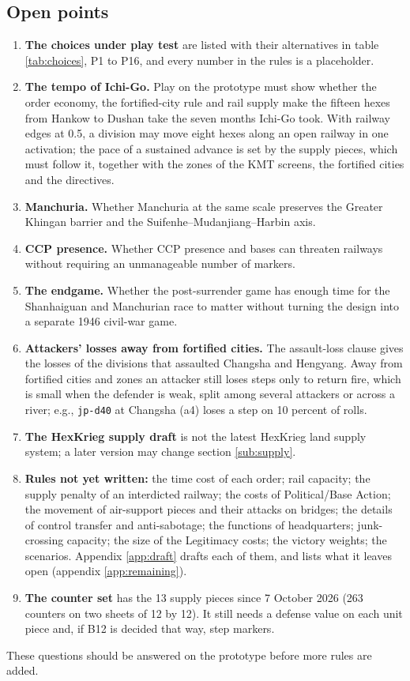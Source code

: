 \documentclass[11pt]{article}
\begin{document}
\subsection{Open points}\label{sub:open}
\begin{enumerate}
\item \textbf{The choices under play test} are listed with their alternatives in table \ref{tab:choices}, P1 to P16, and every number in the rules is a placeholder.
\item \textbf{The tempo of Ichi-Go.} Play on the prototype must show whether the order economy, the fortified-city rule and rail supply make the fifteen hexes from Hankow to Dushan take the seven months Ichi-Go took. With railway edges at 0.5, a division may move eight hexes along an open railway in one activation; the pace of a sustained advance is set by the supply pieces, which must follow it, together with the zones of the KMT screens, the fortified cities and the directives.
\item \textbf{Manchuria.} Whether Manchuria at the same scale preserves the Greater Khingan barrier and the Suifenhe--Mudanjiang--Harbin axis.
\item \textbf{CCP presence.} Whether CCP presence and bases can threaten railways without requiring an unmanageable number of markers.
\item \textbf{The endgame.} Whether the post-surrender game has enough time for the Shanhaiguan and Manchurian race to matter without turning the design into a separate 1946 civil-war game.
\item \textbf{Attackers' losses away from fortified cities.} The assault-loss clause gives the losses of the divisions that assaulted Changsha and Hengyang. Away from fortified cities and zones an attacker still loses steps only to return fire, which is small when the defender is weak, split among several attackers or across a river; e.g., \texttt{jp-d40} at Changsha (a4) loses a step on 10 percent of rolls.
\item \textbf{The HexKrieg supply draft} is not the latest HexKrieg land supply system; a later version may change section \ref{sub:supply}.
\item \textbf{Rules not yet written:} the time cost of each order; rail capacity; the supply penalty of an interdicted railway; the costs of Political/Base Action; the movement of air-support pieces and their attacks on bridges; the details of control transfer and anti-sabotage; the functions of headquarters; junk-crossing capacity; the size of the Legitimacy costs; the victory weights; the scenarios. Appendix \ref{app:draft} drafts each of them, and lists what it leaves open (appendix \ref{app:remaining}).
\item \textbf{The counter set} has the 13 supply pieces since 7 October 2026 (263 counters on two sheets of 12 by 12). It still needs a defense value on each unit piece and, if B12 is decided that way, step markers.
\end{enumerate}
These questions should be answered on the prototype before more rules are added.
\end{document}
